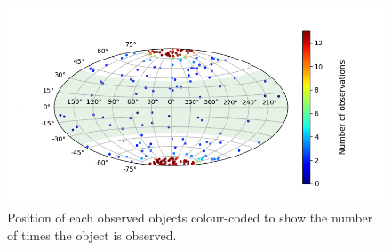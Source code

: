 \documentclass[12pt]{report}
\begin{document}
\begin{figure}[h!]
	\centering
	\includegraphics[width=\textwidth]{img/skymap_TESS_multi.png}
	  \caption{Position of each observed objects colour-coded to show the number of times the object is observed.}	
	  \label{fig:skymap_TESS}	
\end{figure}\newpage
	  
\end{document}
